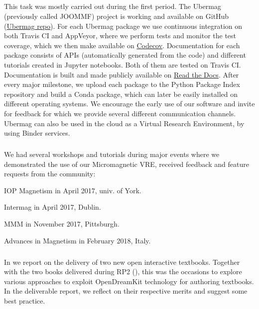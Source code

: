 \subparagraph{}
\label{dissem@dissemination-of-oommf-nb-virtual-environment}


This task was mostly carried out during the first period. The Ubermag
(previously called JOOMMF) project is working and available on GitHub
(\href{https://github.com/ubermag}{Ubermag repo}). For each Ubermag
package we use continuous integration on both Travis CI and AppVeyor,
where we perform tests and monitor the test coverage, which we then
make available on \href{https://codecov.io/}{Codecov}. Documentation
for each package consists of APIs (automatically generated from the
code) and different tutorials created in Jupyter notebooks. Both of
them are tested on Travis CI. Documentation is built and made publicly
available on \href{http://discretisedfield.readthedocs.io}{Read the
  Docs}. After every major milestone, we upload each package to the
Python Package Index repository and build a Conda package, which can
later be easily installed on different operating systems. We encourage
the early use of our software and invite for feedback for which we
provide several different communication channels. Ubermag can also be
used in the cloud as a Virtual Research Environment, by using Binder
services.

\subparagraph{}
\label{dissem@dissemination-of-oommf-nb-workshops}

We had several workshops and tutorials during major events where we demonstrated the use of our Micromagnetic VRE, received feedback and feature requests from the community:

\begin{compactitem}
\item IOP Magnetism in April 2017, univ. of York.
\item Intermag in April 2017, Dublin.
\item MMM in November 2017, Pittsburgh.
\item Advances in Magnetism in February 2018, Italy.
\end{compactitem}

\subparagraph{}
\label{dissem@ibook}

In  we report on the delivery of two new
open interactive textbooks. Together with the two books delivered
during RP2 (), this was the occasions to
explore various approaches to exploit OpenDreamKit technology for
authoring textbooks. In the deliverable report, we reflect on their
respective merits and suggest some best practice.

